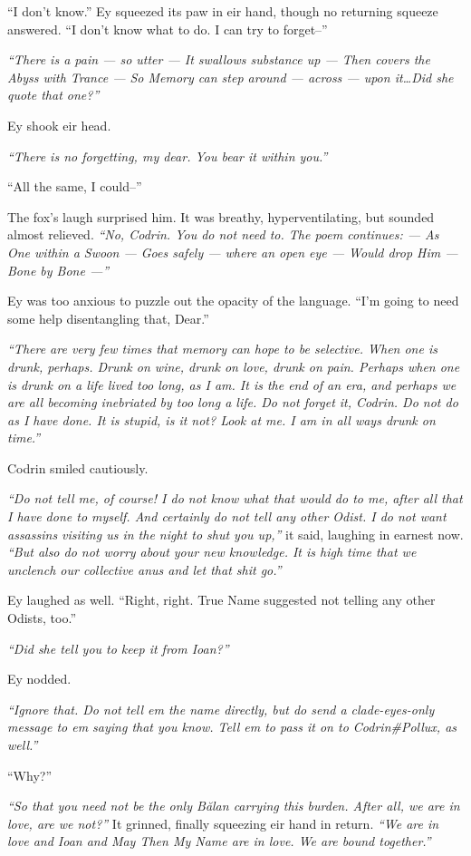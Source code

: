``I don't know.'' Ey squeezed its paw in eir hand, though no returning squeeze answered. ``I don't know what to do. I can try to forget--''

\emph{``There is a pain — so utter — It swallows substance up — Then covers the Abyss with Trance — So Memory can step around — across — upon it\ldots Did she quote that one?''}

Ey shook eir head.

\emph{``There is no forgetting, my dear. You bear it within you.''}

``All the same, I could--''

The fox's laugh surprised him. It was breathy, hyperventilating, but sounded almost relieved. \emph{``No, Codrin. You do not need to. The poem continues: — As One within a Swoon — Goes safely — where an open eye — Would drop Him — Bone by Bone —''}

Ey was too anxious to puzzle out the opacity of the language. ``I'm going to need some help disentangling that, Dear.''

\emph{``There are very few times that memory can hope to be selective. When one is drunk, perhaps. Drunk on wine, drunk on love, drunk on pain. Perhaps when one is drunk on a life lived too long, as I am. It is the end of an era, and perhaps we are all becoming inebriated by too long a life. Do not forget it, Codrin. Do not do as I have done. It is stupid, is it not? Look at me. I am in all ways drunk on time.''}

Codrin smiled cautiously.

\emph{``Do not tell me, of course! I do not know what that would do to me, after all that I have done to myself. And certainly do not tell any other Odist. I do not want assassins visiting us in the night to shut you up,''} it said, laughing in earnest now. \emph{``But also do not worry about your new knowledge. It is high time that we unclench our collective anus and let that shit go.''}

Ey laughed as well. ``Right, right. True Name suggested not telling any other Odists, too.''

\emph{``Did she tell you to keep it from Ioan?''}

Ey nodded.

\emph{``Ignore that. Do not tell em the name directly, but do send a clade-eyes-only message to em saying that you know. Tell em to pass it on to Codrin\#Pollux, as well.''}

``Why?''

\emph{``So that you need not be the only Bălan carrying this burden. After all, we are in love, are we not?''} It grinned, finally squeezing eir hand in return. \emph{``We are in love and Ioan and May Then My Name are in love. We are bound together.''}

